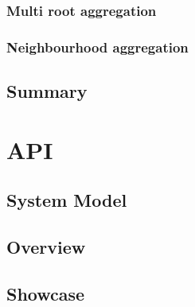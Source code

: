 \subsubsection{Multi root aggregation}

\subsubsection{Neighbourhood aggregation}

\subsection{Summary}

\section{API}

\subsection{System Model}

\subsection{Overview}

\subsection{Showcase}